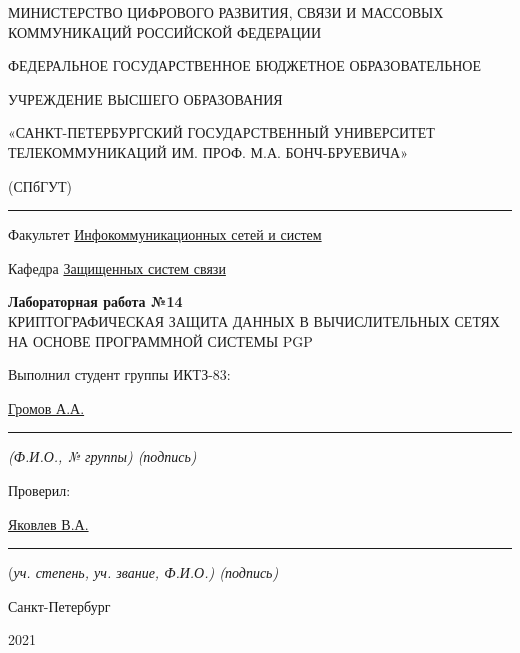 \documentclass[a4paper,14pt]{extarticle}
\begin{document}
    \begin{center}
        \thispagestyle{empty}
        \begin{singlespace}
        МИНИСТЕРСТВО ЦИФРОВОГО РАЗВИТИЯ, СВЯЗИ И МАССОВЫХ КОММУНИКАЦИЙ РОССИЙСКОЙ ФЕДЕРАЦИИ

        ФЕДЕРАЛЬНОЕ ГОСУДАРСТВЕННОЕ БЮДЖЕТНОЕ ОБРАЗОВАТЕЛЬНОЕ

        УЧРЕЖДЕНИЕ ВЫСШЕГО ОБРАЗОВАНИЯ

        «САНКТ-ПЕТЕРБУРГСКИЙ ГОСУДАРСТВЕННЫЙ УНИВЕРСИТЕТ ТЕЛЕКОММУНИКАЦИЙ ИМ. ПРОФ. М.А. БОНЧ-БРУЕВИЧА»

        (СПбГУТ)
        \end{singlespace}
        \vspace{-1ex}
        \rule{\textwidth}{0.4pt}
        \vspace{-5ex}

        Факультет \underline{Инфокоммуникационных сетей и систем}

        Кафедра \underline{Защищенных систем связи}
        \vspace{10ex}

        \textbf{Лабораторная работа №14}\\
        КРИПТОГРАФИЧЕСКАЯ ЗАЩИТА ДАННЫХ В ВЫЧИСЛИТЕЛЬНЫХ СЕТЯХ НА ОСНОВЕ ПРОГРАММНОЙ СИСТЕМЫ PGP


    \end{center}
    \vspace{4ex}
    \begin{flushright}
    \parbox{10 cm}{
    \begin{flushleft}
        Выполнил студент группы ИКТЗ-83:

        \underline{Громов А.А. } \hfill \rule[-0.85ex]{0.1\textwidth}{0.6pt}

        \footnotesize \textit{ (Ф.И.О., № группы) \hfill (подпись)} \normalsize

        Проверил:

        \underline{Яковлев В.А.} \hfill \rule[-0.85ex]{0.1\textwidth}{0.6pt}

        (\footnotesize \textit{уч. степень, уч. звание, Ф.И.О.) \hfill (подпись)} \normalsize

    \end{flushleft}
    }
    \end{flushright}
    \begin{center}
        \vfill
        Санкт-Петербург

        2021

    \end{center}
    \newpage
\end{document}

